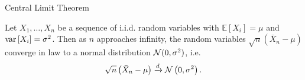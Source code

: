     \begin{frame}{Central Limit Theorem}
        \begin{theorem}
            Let $X_1, \dots, X_n$ be a sequence of i.i.d. random variables with $\mathbb{E}[X_i] = \mu$ and $\operatorname*{var}\left[X_i\right] = \sigma^2$. 
            Then as $n$ approaches infinity, the random variables $\sqrt{n}(\bar{X}_n - \mu)$ converge in law to a normal distribution ${\cal N}(0, \sigma^2)$, i.e.
            \begin{equation}
                \sqrt{n}\left(\bar{X}_n - \mu\right) \xrightarrow{d} {\cal N}\left(0,\sigma^2\right).
            \end{equation}
        \end{theorem}
    \end{frame}